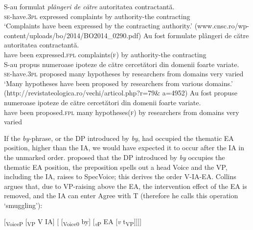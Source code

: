 \documentclass[output=paper]{langsci/langscibook}
\begin{document}
\ea%
    \label{ex:giurgea:29}
    \begin{xlista}[m'.]
    \gll  S-au             {formulat} \emph{plângeri     de către}{ autoritatea     contractantă}{.}\\
          \textsc{se-}have.3\textsc{pl} expressed complaints by          authority-the contracting\\
    \glt  ‘Complaints have been expressed by the contracting authority.’ (www.cnsc.ro/wp-content/uploads/bo/2014/BO2014\_0290.pdf)
    \gll Au   fost  formulate        plângeri          de către autoritatea    contractantă.\\
         have been expressed.\textsc{fpl} complaints(\textsc{f)} by          authority-the contracting\\
    \ex
    \gll S-au           propus    numeroase ipoteze de către cercetători din domenii foarte variate.\\
         \textsc{se-}have.3\textsc{pl} proposed many        hypotheses by    researchers from domains very varied\\
    \glt ‘Many hypotheses have been proposed by researchers from various domains.’ (http://revistateologica.ro/vechi/articol.php?r=79\& a=4952)
    \gll Au  fost    propuse   numeroase ipoteze      de către cercetători din domenii foarte variate.\\
         have been proposed.\textsc{fpl} many hypotheses(\textsc{f)} by    researchers from domains very varied\\
    \end{xlista}
\z    

If the \textit{by-}phrase, or the DP introduced by \textit{by}, had occupied the thematic EA position, higher than the IA, we would have expected it to occur after the IA in the unmarked order. \citet{Collins2005} proposed that the DP introduced by \textit{by} occupies the thematic EA position, the preposition spells out a head Voice and the VP, including the IA, raises to SpecVoice; this derives the order V-IA-EA. Collins argues that, due to VP-raising above the EA, the intervention effect of the EA is removed, and the IA can enter Agree with T (therefore he calls this operation ‘smuggling’):

\ea%
    \label{ex:giurgea:30}
    [\textsubscript{VoiceP}  [\textsubscript{VP} V IA] [ [\textsubscript{Voice0}  by] [\textit{\textsubscript{v}}\textsubscript{P} EA [\textit{v} t\textsubscript{VP}]]]]
    \z
\end{document}
